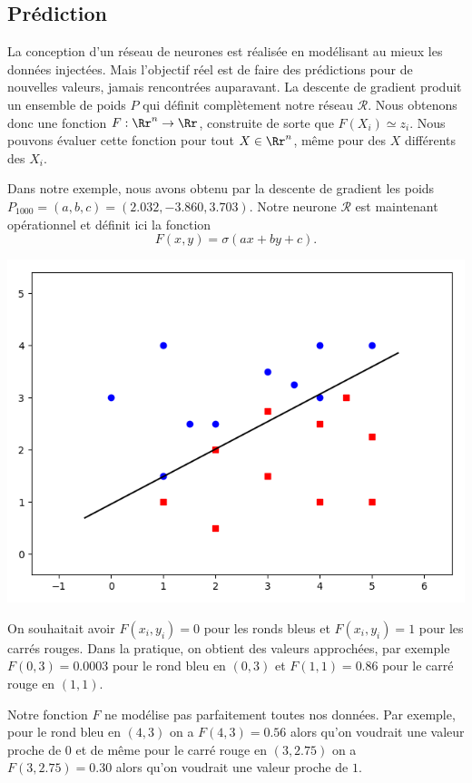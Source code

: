\documentclass[11pt,class=report,crop=false]{standalone}
\begin{document}
\subsection{Prédiction}

La conception d'un réseau de neurones est réalisée en modélisant au mieux les données injectées. Mais l'objectif réel est de faire des prédictions pour de nouvelles valeurs, jamais rencontrées auparavant.
La descente de gradient produit un ensemble de poids $P$ qui définit complètement notre réseau $\mathcal{R}$.
Nous obtenons donc une fonction $F : \Rr^n \to \Rr$, construite de sorte que $F(X_i) \simeq z_i$.
Nous pouvons évaluer cette fonction pour tout $X \in \Rr^n$, même pour des $X$ différents des $X_i$.


\begin{exemple}
Dans notre exemple, nous avons obtenu par la descente de gradient les poids $P_{1000} = (a,b,c) = (2.032, -3.860, 3.703)$.
Notre neurone $\mathcal{R}$ est maintenant opérationnel et définit ici la fonction 
$$F(x,y) = \sigma(ax+by+c).$$

\begin{center}
\includegraphics[scale=\myscale,scale=0.45]{figures/retro_01_e}
\end{center}

On souhaitait avoir $F(x_i,y_i)=0$ pour les ronds bleus et $F(x_i,y_i)=1$ pour les carrés rouges.
Dans la pratique, on obtient des valeurs approchées, par exemple $F(0,3)=0.0003$ pour le rond bleu en $(0,3)$ et $F(1,1)=0.86$ pour le carré rouge en $(1,1)$.

Notre fonction $F$ ne modélise pas parfaitement toutes nos données. Par exemple, pour le rond bleu en $(4,3)$ on a $F(4,3) = 0.56$ alors qu'on voudrait une valeur proche de $0$ et de même pour le carré rouge en $(3,2.75)$ on a $F(3,2.75) = 0.30$ alors qu'on voudrait une valeur proche de $1$. 


\end{exemple}
\end{document}
